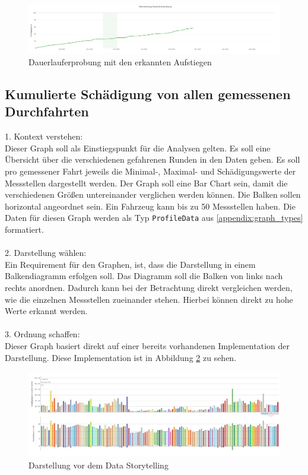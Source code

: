 \begin{figure}[!h]
    \centering
    \includegraphics[width=1\linewidth]{gfx/dauerlauferprobung_story.png}
    \caption{Dauerlauferprobung mit den erkannten Aufstiegen}
    \label{fig:dauerlauferprobung_story}
\end{figure}

\subsection{Kumulierte Schädigung von allen gemessenen Durchfahrten}
\label{section:schaedigung}
1. Kontext verstehen:\\
Dieser Graph soll als Einstiegspunkt für die Analysen gelten. Es soll eine Übersicht über die verschiedenen gefahrenen Runden in den Daten geben. Es soll pro gemessener Fahrt jeweils die Minimal-, Maximal- und Schädigungswerte der Messstellen dargestellt werden. Der Graph soll eine Bar Chart sein, damit die verschiedenen Größen untereinander verglichen werden können. Die Balken sollen horizontal angeordnet sein. Ein Fahrzeug kann bis zu 50 Messstellen haben. Die Daten für diesen Graph werden als Typ \texttt{ProfileData} aus \ref{appendix:graph_types} formatiert. 
\\\\
2. Darstellung wählen:\\
Ein Requirement für den Graphen, ist, dass die Darstellung in einem Balkendiagramm erfolgen soll. Das Diagramm soll die Balken von links nach rechts anordnen. Dadurch kann bei der Betrachtung direkt vergleichen werden, wie die einzelnen Messstellen zueinander stehen. Hierbei können direkt zu hohe Werte erkannt werden.\\\\
3. Ordnung schaffen:\\
Dieser Graph basiert direkt auf einer bereits vorhandenen Implementation der Darstellung. Diese Implementation ist in Abbildung \ref{fig:schaedigung_before} zu sehen.
\begin{figure}[!h]
    \centering
    \includegraphics[width=1\linewidth]{gfx/schaedigung.png}
    \caption{Darstellung vor dem Data Storytelling}
    \label{fig:schaedigung_before}
\end{figure}
